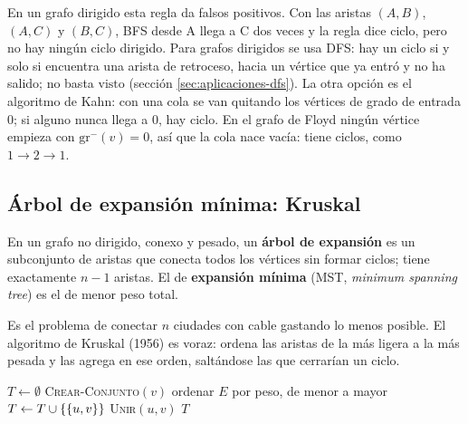 \documentclass[11pt,letterpaper]{article}
\begin{document}
\begin{ojo}
  En un grafo dirigido esta regla da falsos positivos. Con las aristas
  $(A, B)$, $(A, C)$ y $(B, C)$, BFS desde A llega a C dos veces y la
  regla dice ciclo, pero no hay ningún ciclo dirigido. Para grafos
  dirigidos se usa DFS: hay un ciclo si y solo si encuentra una arista
  de retroceso, hacia un vértice que ya entró y no ha salido; no basta
  $\text{visto}$ (sección \ref{sec:aplicaciones-dfs}). La otra opción
  es el algoritmo de Kahn: con una cola se van quitando los vértices de
  grado de entrada $0$; si alguno nunca llega a $0$, hay ciclo. En el
  grafo de
  Floyd ningún vértice empieza con $\text{gr}^{-}(v) = 0$, así que la
  cola nace vacía: tiene ciclos, como $1 \to 2 \to 1$.
\end{ojo}


\subsection*{Árbol de expansión mínima: Kruskal}

\begin{definicion}
  En un grafo no dirigido, conexo y pesado, un \textbf{árbol de
  expansión} es un subconjunto de aristas que conecta todos los
  vértices sin formar ciclos; tiene exactamente $n - 1$ aristas. El
  de \textbf{expansión mínima} (MST, \textit{minimum spanning tree})
  es el de menor peso total.
\end{definicion}

Es el problema de conectar $n$ ciudades con cable gastando lo menos
posible. El algoritmo de Kruskal (1956) es voraz: ordena las aristas de
la más ligera a la más pesada y las agrega en ese orden, saltándose las
que cerrarían un ciclo.

\begin{algorithm}[H]
\caption{\textsc{Kruskal}$(G, w)$}
\begin{algorithmic}[1]
\State $T \gets \emptyset$
  \State \textsc{Crear-Conjunto}$(v)$
\EndFor
\State ordenar $E$ por peso, de menor a mayor
    \State $T \gets T \cup \left\{ \left\{ u, v \right\} \right\}$
    \State \textsc{Unir}$(u, v)$
  \EndIf
\EndFor
\State \Return $T$
\end{algorithmic}
\end{algorithm}
\end{document}
